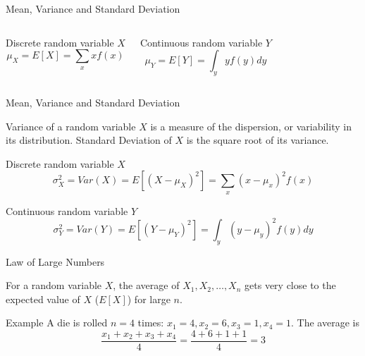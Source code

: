 \documentclass{beamer}\usepackage[]{graphicx}\usepackage[]{color}
\begin{document}
\begin{darkframes}
\begin{frame}[label=lists]{Mean, Variance and Standard Deviation}
		\begin{columns}[onlytextwidth]
        	Discrete random variable $X$
        	$$
				\mu_X = E[X] = \sum_x x f(x)	        	
        	$$  
        	
        	Continuous random variable $Y$
        	$$
				\mu_Y = E[Y] = \int_y y f(y) dy	        	
        	$$
        	        
        \end{columns}


				
	\end{frame}





	\begin{frame}[label=lists]{Mean, Variance and Standard Deviation}
		
		\begin{definition}
			\alert{Variance} of a random variable $X$ is a measure of the dispersion, or variability in its distribution. \alert{Standard Deviation} of $X$ is the square root of its variance.
		\end{definition}  \pause
		
        	Discrete random variable $X$
        	$$
				\sigma^2_X = Var(X) = E[(X-\mu_X)^2] = \sum_x (x-\mu_x)^2 f(x)	        	
        	$$   \pause
        	
        	Continuous random variable $Y$
        	$$
				\sigma^2_Y = Var(Y) = E[(Y-\mu_Y)^2] = \int_y (y-\mu_y)^2 f(y)dy	        	
        	$$
   			
	\end{frame}





	\begin{frame}[label=lists]{Law of Large Numbers}
		
		\begin{definition}
			For a random variable $X$, the average of $X_1, X_2,\ldots,X_n$ gets very close to the expected value of $X$ ($E[X]$) for large $n$.
		\end{definition}  \pause
		
		
		\begin{exampleblock}{Example}
			A die is rolled $n=4$ times: $x_1=4, x_2=6, x_3=1, x_4=1$. The average is
			$$
				\frac{x_1 + x_2 + x_3 + x_4}{4} = \frac{4+6+1+1}{4}=3
			$$
		\end{exampleblock}  \pause
		

\end{frame}
\end{darkframes}
\end{document}
